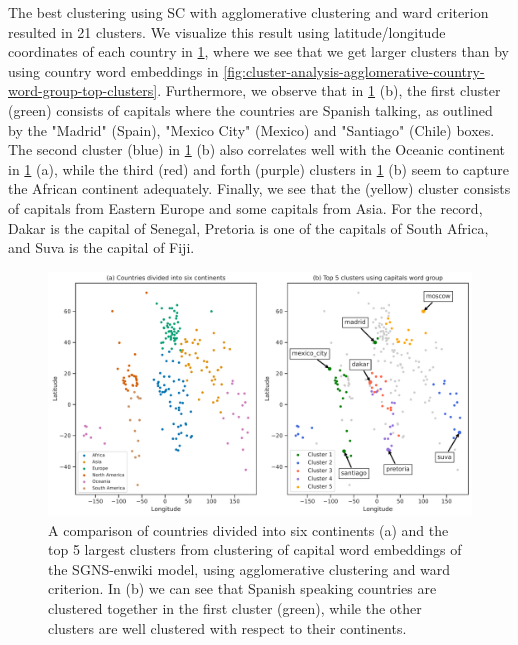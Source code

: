 The best clustering using SC with agglomerative clustering and ward criterion resulted in 21 clusters. We visualize this result using latitude/longitude coordinates of each country in \cref{fig:cluster-analysis-agglomerative-country-capitals-word-group-top-clusters}, where we see that we get larger clusters than by using country word embeddings in \cref{fig:cluster-analysis-agglomerative-country-word-group-top-clusters}. Furthermore, we observe that in \cref{fig:cluster-analysis-agglomerative-country-capitals-word-group-top-clusters} (b), the first cluster (green) consists of capitals where the countries are Spanish talking, as outlined by the "Madrid" (Spain), "Mexico City" (Mexico) and "Santiago" (Chile) boxes.
The second cluster (blue) in \cref{fig:cluster-analysis-agglomerative-country-capitals-word-group-top-clusters} (b) also correlates well with the Oceanic continent in \cref{fig:cluster-analysis-agglomerative-country-capitals-word-group-top-clusters} (a), while the third (red) and forth (purple) clusters in \cref{fig:cluster-analysis-agglomerative-country-capitals-word-group-top-clusters} (b) seem to capture the African continent adequately. Finally, we see that the (yellow) cluster consists of capitals from Eastern Europe and some capitals from Asia. For the record, Dakar is the capital of Senegal, Pretoria is one of the capitals of South Africa, and Suva is the capital of Fiji.
\begin{figure}[H]
    \centering
    \includegraphics[width=\textwidth]{thesis/figures/cluster-analysis-agglomerative-country-capitals-word-group-top-clusters.pdf}
    \caption{A comparison of countries divided into six continents (a) and the top 5 largest clusters from clustering of capital word embeddings of the SGNS-enwiki model, using agglomerative clustering and ward criterion. In (b) we can see that Spanish speaking countries are clustered together in the first cluster (green), while the other clusters are well clustered with respect to their continents.}
    \label{fig:cluster-analysis-agglomerative-country-capitals-word-group-top-clusters}
\end{figure}

